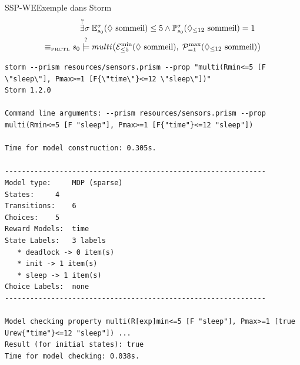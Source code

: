 \documentclass[compress]{beamer}
\theoremstyle{theorem}%
\begin{document}
\begin{frame}[fragile]{SSP-WE}{Exemple dans Storm}
    \vspace{-0.05\linewidth}
    \footnotesize
    \begin{align*}
      &\overset{?}{\exists} \sigma \; \mathbb{E}^{\sigma}_{s_0}(\Diamond \text{ sommeil}) \leq 5 \wedge \mathbb{P}^\sigma_{s_0}(\Diamond_{\leq 12} \text{ sommeil}) = 1 \\
      \equiv_{\text{\tiny PRCTL}}s_0 &\overset{?}{\models} multi\big( \mathcal{E}^{\min}_{\leq 5} (\Diamond \text{ sommeil}), \; \mathcal{P}^{\max}_{=1} (\Diamond_{\leq 12} \text{ sommeil})\big)
    \end{align*}
     {\fontsize{4}{5}
  \begin{verbatim}
storm --prism resources/sensors.prism --prop "multi(Rmin<=5 [F \"sleep\"], Pmax>=1 [F{\"time\"}<=12 \"sleep\"])"
Storm 1.2.0

Command line arguments: --prism resources/sensors.prism --prop multi(Rmin<=5 [F "sleep"], Pmax>=1 [F{"time"}<=12 "sleep"])

Time for model construction: 0.305s.

--------------------------------------------------------------
Model type: 	MDP (sparse)
States: 	4
Transitions: 	6
Choices: 	5
Reward Models:  time
State Labels: 	3 labels
   * deadlock -> 0 item(s)
   * init -> 1 item(s)
   * sleep -> 1 item(s)
Choice Labels: 	none
--------------------------------------------------------------

Model checking property multi(R[exp]min<=5 [F "sleep"], Pmax>=1 [true Urew{"time"}<=12 "sleep"]) ...
Result (for initial states): true
Time for model checking: 0.038s.
  \end{verbatim}
  }
\end{frame}
\end{document}
